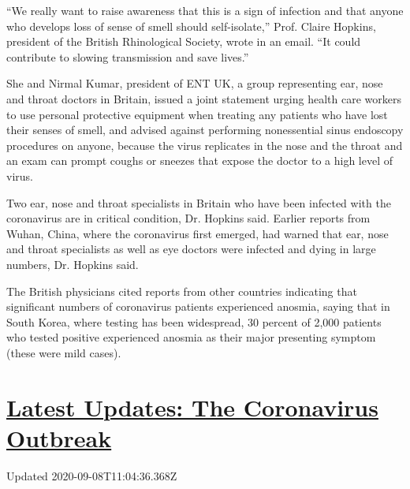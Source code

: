 ``We really want to raise awareness that this is a sign of infection and
that anyone who develops loss of sense of smell should self-isolate,''
Prof. Claire Hopkins, president of the British Rhinological Society,
wrote in an email. ``It could contribute to slowing transmission and
save lives.''

She and Nirmal Kumar, president of ENT UK, a group representing ear,
nose and throat doctors in Britain, issued a joint statement urging
health care workers to use personal protective equipment when treating
any patients who have lost their senses of smell, and advised against
performing nonessential sinus endoscopy procedures on anyone, because
the virus replicates in the nose and the throat and an exam can prompt
coughs or sneezes that expose the doctor to a high level of virus.

Two ear, nose and throat specialists in Britain who have been infected
with the coronavirus are in critical condition, Dr. Hopkins said.
Earlier reports from Wuhan, China, where the coronavirus first emerged,
had warned that ear, nose and throat specialists as well as eye doctors
were infected and dying in large numbers, Dr. Hopkins said.

The British physicians cited reports from other countries indicating
that significant numbers of coronavirus patients experienced anosmia,
saying that in South Korea, where testing has been widespread, 30
percent of 2,000 patients who tested positive experienced anosmia as
their major presenting symptom (these were mild cases).

\hypertarget{latest-updates-the-coronavirus-outbreak}{%
\section{\texorpdfstring{\href{https://www.nytimes3xbfgragh.onion/2020/09/08/world/covid-19-coronavirus.html?action=click\&pgtype=Article\&state=default\&region=MAIN_CONTENT_1\&context=storylines_live_updates}{Latest
Updates: The Coronavirus
Outbreak}}{Latest Updates: The Coronavirus Outbreak}}\label{latest-updates-the-coronavirus-outbreak}}

Updated 2020-09-08T11:04:36.368Z

